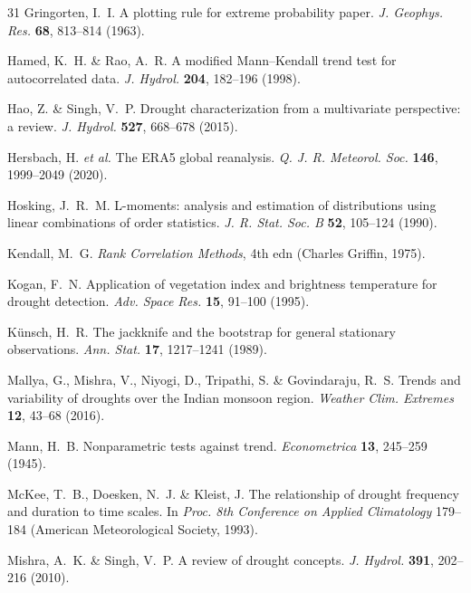 \documentclass[10pt,a4paper]{article}
\begin{document}
\begin{thebibliography}{31}
 Gringorten, I.~I. A plotting rule for extreme probability paper. \textit{J. Geophys. Res.} \textbf{68}, 813--814 (1963).

 Hamed, K.~H. \& Rao, A.~R. A modified Mann--Kendall trend test for autocorrelated data. \textit{J. Hydrol.} \textbf{204}, 182--196 (1998).

 Hao, Z. \& Singh, V.~P. Drought characterization from a multivariate perspective: a review. \textit{J. Hydrol.} \textbf{527}, 668--678 (2015).

 Hersbach, H. \textit{et al.} The ERA5 global reanalysis. \textit{Q. J. R. Meteorol. Soc.} \textbf{146}, 1999--2049 (2020).

 Hosking, J.~R.~M. L-moments: analysis and estimation of distributions using linear combinations of order statistics. \textit{J. R. Stat. Soc. B} \textbf{52}, 105--124 (1990).

 Kendall, M.~G. \textit{Rank Correlation Methods}, 4th edn (Charles Griffin, 1975).

 Kogan, F.~N. Application of vegetation index and brightness temperature for drought detection. \textit{Adv. Space Res.} \textbf{15}, 91--100 (1995).

 K\"{u}nsch, H.~R. The jackknife and the bootstrap for general stationary observations. \textit{Ann. Stat.} \textbf{17}, 1217--1241 (1989).

 Mallya, G., Mishra, V., Niyogi, D., Tripathi, S. \& Govindaraju, R.~S. Trends and variability of droughts over the Indian monsoon region. \textit{Weather Clim. Extremes} \textbf{12}, 43--68 (2016).

 Mann, H.~B. Nonparametric tests against trend. \textit{Econometrica} \textbf{13}, 245--259 (1945).

 McKee, T.~B., Doesken, N.~J. \& Kleist, J. The relationship of drought frequency and duration to time scales. In \textit{Proc. 8th Conference on Applied Climatology} 179--184 (American Meteorological Society, 1993).

 Mishra, A.~K. \& Singh, V.~P. A review of drought concepts. \textit{J. Hydrol.} \textbf{391}, 202--216 (2010).


\end{thebibliography}
\end{document}
